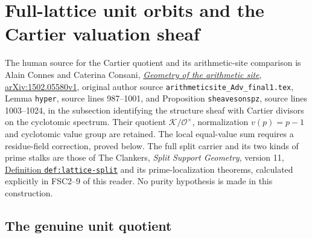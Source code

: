 \section{Full-lattice unit orbits and the Cartier valuation sheaf}
\label{sec:full-lattice-cartier-quotient}

The human source for the Cartier quotient and its arithmetic-site
comparison is Alain Connes and Caterina Consani,
\href{https://arxiv.org/abs/1502.05580v1}{\emph{Geometry of the
arithmetic site}, arXiv:1502.05580v1},
original author source
\texttt{arithmeticsite\_\allowbreak Adv\_\allowbreak final1.tex},
Lemma \texttt{hyper}, source lines 987--1001, and
Proposition \texttt{sheavesonspz}, source lines 1003--1024,
in the subsection identifying the structure sheaf with
Cartier divisors on the cyclotomic spectrum. Their quotient
$\mathcal K/\mathcal O^\times$, normalization $v(p)=p-1$ and
cyclotomic value group are retained. The local equal-value sum
requires a residue-field correction, proved below. The full
split carrier and its two kinds of prime stalks are those of
The Clankers, \emph{Split Support Geometry}, version 11,
\href{https://github.com/KokunoYumeto/zeta-function-research-reader/blob/a2851f9eb352e7e4376bc629de86fa4ed9c1c434/workbenches/splitzero-tandem/foundations/split-support-geometry-v11/split_support_geometry_arithmetic_curve_v11.tex#L1226}{Definition \texttt{def:lattice-split}}
and its prime-localization theorems, calculated explicitly
in FSC2--9 of this reader. No purity hypothesis is made
in this construction.

\subsection{The genuine unit quotient}

